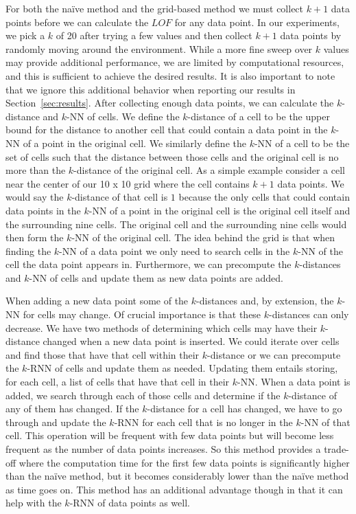 \documentclass[../main.tex]{subfiles}
\begin{document}
For both the na\"ive method and the grid-based method we must collect $k + 1$ data points before we can calculate the $LOF$ for any data point. In our experiments, we pick a $k$ of 20 after trying a few values and then collect $k + 1$ data points by randomly moving around the environment. While a more fine sweep over $k$ values may provide additional performance, we are limited by computational resources, and this is sufficient to achieve the desired results. It is also important to note that we ignore this additional behavior when reporting our results in Section~\ref{sec:results}. After collecting enough data points, we can calculate the $k$-distance and $k$-NN of cells. We define the $k$-distance of a cell to be the upper bound for the distance to another cell that could contain a data point in the $k$-NN of a point in the original cell. We similarly define the $k$-NN of a cell to be the set of cells such that the distance between those cells and the original cell is no more than the $k$-distance of the original cell. As a simple example consider a cell near the center of our 10 x 10 grid where the cell contains $k + 1$ data points. We would say the $k$-distance of that cell is $1$ because the only cells that could contain data points in the $k$-NN of a point in the original cell is the original cell itself and the surrounding nine cells. The original cell and the surrounding nine cells would then form the $k$-NN of the original cell. The idea behind the grid is that when finding the $k$-NN of a data point we only need to search cells in the $k$-NN of the cell the data point appears in. Furthermore, we can precompute the $k$-distances and $k$-NN of cells and update them as new data points are added.

When adding a new data point some of the $k$-distances and, by extension, the $k$-NN for cells may change. Of crucial importance is that these $k$-distances can only decrease. We have two methods of determining which cells may have their $k$-distance changed when a new data point is inserted. We could iterate over cells and find those that have that cell within their $k$-distance or we can precompute the $k$-RNN of cells and update them as needed. Updating them entails storing, for each cell, a list of cells that have that cell in their $k$-NN. When a data point is added, we search through each of those cells and determine if the $k$-distance of any of them has changed. If the $k$-distance for a cell has changed, we have to go through and update the $k$-RNN for each cell that is no longer in the $k$-NN of that cell. This operation will be frequent with few data points but will become less frequent as the number of data points increases. So this method provides a trade-off where the computation time for the first few data points is significantly higher than the na\"ive method, but it becomes considerably lower than the na\"ive method as time goes on. This method has an additional advantage though in that it can help with the $k$-RNN of data points as well.
\end{document}
